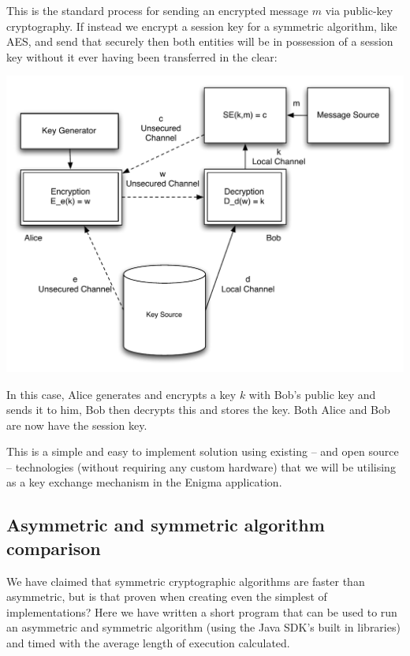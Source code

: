 This is the standard process for sending an encrypted message $m$ via public-key cryptography. If instead we encrypt a session key for a symmetric algorithm, like AES, and send that securely then both entities will be in possession of a session key without it ever having been transferred in the clear:

\begin{center}
  \includegraphics[scale=0.6]{./Figures/3-7b.pdf}
\end{center}

In this case, Alice generates and encrypts a key $k$ with Bob's public key and sends it to him, Bob then decrypts this and stores the key. Both Alice and Bob are now have the session key.

This is a simple and easy to implement solution using existing -- and open source -- technologies (without requiring any custom hardware) that we will be utilising as a key exchange mechanism in the Enigma application.

\subsection{Asymmetric and symmetric algorithm comparison}

We have claimed that symmetric cryptographic algorithms are faster than asymmetric, but is that proven when creating even the simplest of implementations? Here we have written a short program that can be used to run an asymmetric and symmetric algorithm (using the Java SDK's built in libraries) and timed with the average length of execution calculated.

